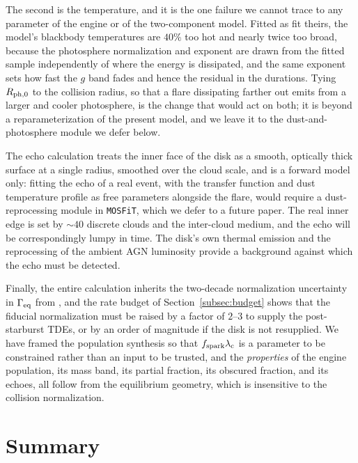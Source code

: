 \documentclass[twocolumn,pdftex]{aastex701}
\newcommand{\mosfit}{{\tt MOSFiT}\xspace}
\newcommand{\gameq}{\Gamma_{\rm eq}\xspace}
\newcommand{\fspark}{f_{\rm spark}\xspace}
\newcommand{\lamc}{\lambda_{\rm c}\xspace}
\begin{document}
The second is the temperature, and it is the one failure we cannot trace to any parameter of the engine or of the two-component model. Fitted as \citet{Yao:2023a} fit theirs, the model's blackbody temperatures are $40\%$ too hot and nearly twice too broad, because the photosphere normalization and exponent are drawn from the fitted sample independently of where the energy is dissipated, and the same exponent sets how fast the $g$ band fades and hence the residual in the durations. Tying $R_{\rm ph,0}$ to the collision radius, so that a flare dissipating farther out emits from a larger and cooler photosphere, is the change that would act on both; it is beyond a reparameterization of the present model, and we leave it to the dust-and-photosphere module we defer below.

The echo calculation treats the inner face of the disk as a smooth, optically thick surface at a single radius, smoothed over the cloud scale, and is a forward model only: fitting the echo of a real event, with the transfer function and dust temperature profile as free parameters alongside the flare, would require a dust-reprocessing module in \mosfit, which we defer to a future paper. The real inner edge is set by $\sim 40$ discrete clouds and the inter-cloud medium, and the echo will be correspondingly lumpy in time. The disk's own thermal emission and the reprocessing of the ambient AGN luminosity provide a background against which the echo must be detected.

Finally, the entire calculation inherits the two-decade normalization uncertainty in $\gameq$ from \citet{Guillochon:2026a}, and the rate budget of Section~\ref{subsec:budget} shows that the fiducial normalization must be raised by a factor of $2$--$3$ to supply the post-starburst TDEs, or by an order of magnitude if the disk is not resupplied. We have framed the population synthesis so that $\fspark \lamc$ is a parameter to be constrained rather than an input to be trusted, and the {\it properties} of the engine population, its mass band, its partial fraction, its obscured fraction, and its echoes, all follow from the equilibrium geometry, which is insensitive to the collision normalization.

\section{Summary}\label{sec:summary}
\end{document}

